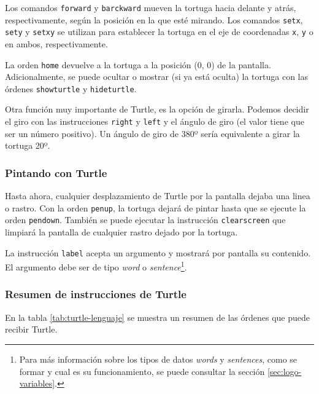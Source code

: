 Los comandos \texttt{forward} y \texttt{barckward} mueven la tortuga hacia delante y atrás, respectivamente, según la posición en la que esté mirando. Los comandos \texttt{setx}, \texttt{sety} y \texttt{setxy} se utilizan para establecer la tortuga en el eje de coordenadas \texttt{x}, \texttt{y} o en ambos, respectivamente.

La orden \texttt{home} devuelve a la tortuga a la posición (0, 0) de la pantalla. Adicionalmente, se puede ocultar o mostrar (si ya está oculta) la tortuga con las órdenes \texttt{showturtle} y \texttt{hideturtle}.

Otra función muy importante de Turtle, es la opción de girarla. Podemos decidir el giro con las instrucciones \texttt{right} y \texttt{left} y el ángulo de giro (el valor tiene que ser un número positivo). Un ángulo de giro de 380º sería equivalente a girar la tortuga 20º.


\subsubsection*{Pintando con Turtle}

Hasta ahora, cualquier desplazamiento de Turtle por la pantalla dejaba una linea o rastro. Con la orden \texttt{penup}, la tortuga dejará de pintar hasta que se ejecute la orden \texttt{pendown}. También se puede ejecutar la instrucción \texttt{clearscreen} que limpiará la pantalla de cualquier rastro dejado por la tortuga.

La instrucción \texttt{label} acepta un argumento y mostrará por pantalla su contenido. El argumento debe ser de tipo \emph{word} o \emph{sentence}\footnote{Para más información sobre los tipos de datos \emph{words} y \emph{sentences}, como se formar y cual es su funcionamiento, se puede consultar la sección \ref{sec:logo-variables}.}.

\subsubsection*{Resumen de instrucciones de Turtle}


En la tabla \ref{tab:turtle-lenguaje} se muestra un resumen de las órdenes que puede recibir Turtle.

